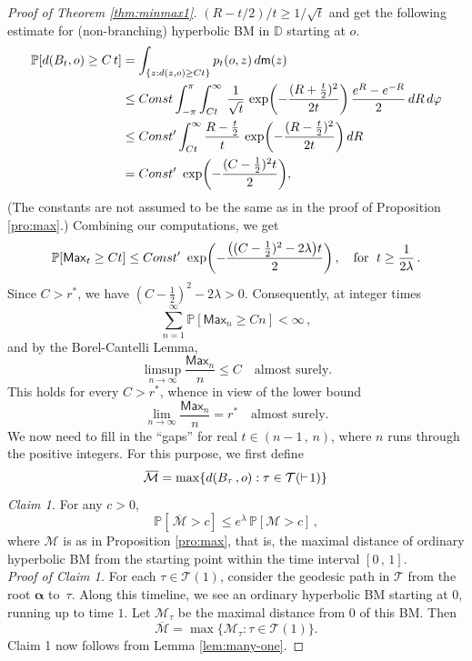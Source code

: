 \documentclass[12pt]{amsart}
\newcommand\bal{\boldsymbol{\alpha}}
\newcommand\BB{\textit{\textbf{B}}}
\newcommand\DD{\mathbb D}
\newcommand\mm{\mathsf m}
\newcommand\Prob{\mathbb P}
\newcommand\ro{d}
\newcommand\T{\mathcal T}
\numberwithin{theorem}{section}
\theoremstyle{definition}
\begin{document}
\begin{proof}[Proof of Theorem \ref{thm:minmax1}]
$(R-t/2)/t \ge 1/\sqrt{t}$ and get the following estimate for 
(non-branching) hyperbolic BM in $\DD$ starting at $o$. 
$$
\begin{aligned}
 \Prob[ \ro(B_t,o) \ge C\, t] &= \int_{\{z : \ro(z,o) \ge Ct\}} p_t(o,z)\,d\mm(z)\\
 &\le \textsl{Const} \int_{-\pi}^{\pi} \int_{Ct}^{\infty}
\, \frac{1}{\sqrt{t}} \, \exp\biggl(-\frac{(R+\tfrac{t}{2})^2}{2t}\biggr) \, \frac{e^R - e^{-R}}{2}\,
dR\, d\varphi\\
&\le \textsl{Const}'  \int_{Ct}^{\infty}\frac{R - \tfrac{t}{2}}{t} \, 
\exp\biggl(-\frac{(R-\tfrac{t}{2})^2}{2t}\biggr)\, dR\\
&= \textsl{Const}'\,\,
\exp\biggl(-\frac{(C-\tfrac12)^2 t}{2}\biggr),
\end{aligned}
$$
(The constants are not assumed to be the same as in the proof of Proposition \ref{pro:max}.)
Combining our computations, we get 
$$
\Prob[ \mathsf{Max}_t \ge Ct] \le \textsl{Const}' \, \,
\exp\biggl(-\frac{\bigl((C-\tfrac12)^2 - 2\lambda\bigr) t}{2}\biggr)\,,\quad \text{for }\; 
t \ge \frac{1}{2\lambda}\,.
$$ 
Since $C > r^*$, we have $(C-\tfrac12)^2 - 2\lambda > 0$.
Consequently, at integer times
$$
\sum_{n=1}^{\infty} \Prob[ \mathsf{Max}_n \ge Cn] < \infty\,,
$$
and by the Borel-Cantelli Lemma, 
$$
\limsup_{n\to \infty} \frac{\mathsf{Max}_n}{n} \le C  \quad \text{almost surely.} 
$$
This holds for every $C > r^*$, whence in view of the lower bound
$$
\lim_{n\to \infty} \frac{\mathsf{Max}_n}{n} = r^* \quad \text{almost surely.}
$$
We now need to fill in the ``gaps'' for real $t \in (n-1\,,\,n)$, where 
$n$ runs through the positive integers. For this purpose, we first 
define
$$
\overline{\!\mathcal{M}} = \max \{ \ro(\BB_{\tau}\,,o) : \tau \in \T(\vdash\! 1)\}
$$
\emph{Claim 1.} For any $c > 0$, 
$$
\Prob[\,\overline{\!\mathcal{M}} > c] \le e^{\lambda} \, \Prob[\mathcal{M} >c]\,,
$$
where $\mathcal{M}$ is as in Proposition \ref{pro:max}, that is, the maximal distance
of ordinary hyperbolic BM from the starting point within the time interval $[0\,,\,1]$. 
\\[5pt]
\emph{Proof of Claim 1.} For each $\tau \in \T(1)$, consider the 
geodesic path in $\T$ from the root $\bal$ to~$\tau$. Along this timeline,
we see an ordinary hyperbolic BM starting at $0$, running up to time $1$. 
Let $\mathcal{M}_{\tau}$ be the maximal distance from $0$ of this BM. Then 
$$
\overline{\!\mathcal{M}} = \max \{ \mathcal{M}_{\tau} : \tau \in \T(1) \}.
$$
Claim 1 now follows from Lemma \ref{lem:many-one}.


\end{proof}
\end{document}
